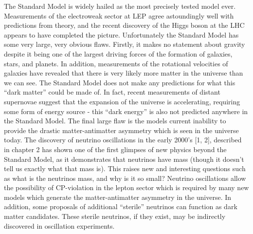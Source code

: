 The Standard Model is widely hailed as the most precisely tested model ever. Measurements
of the electroweak sector at LEP agree astoundingly well with predictions
from theory, and the recent discovery of the Higgs boson at the LHC appears to
have completed the picture.
Unfortunately the Standard Model has some very large, very obvious flaws.
Firstly, it makes no statement about gravity despite it being one of the largest
driving forces of the formation of galaxies, stars, and planets. In addition, measurements
of the rotational velocities of galaxies have revealed that there is very
likely more matter in the universe than we can see. The Standard Model does not
make any predictions for what this “dark matter” could be made of. In fact, recent
measurements of distant supernovae suggest that the expansion of the universe is
accelerating, requiring some form of energy source - this “dark energy” is also not
predicted anywhere in the Standard Model. The final large flaw is the models current
inability to provide the drastic matter-antimatter asymmetry which is seen in
the universe today.
The discovery of neutrino oscillations in the early 2000’s [1, 2], described in
chapter 2 has shown one of the first glimpses of new physics beyond the Standard
Model, as it demonstrates that neutrinos have mass (though it doesn’t tell us exactly
what that mass is). This raises new and interesting questions such as what is the
neutrinos mass, and why is it so small?
Neutrino oscillations allow the possibility of CP-violation in the lepton sector
which is required by many new models which generate the matter-antimatter asymmetry
in the universe. In addition, some proposals of additional “sterile” neutrinos
can function as dark matter candidates. These sterile neutrinos, if they exist, may
be indirectly discovered in oscillation experiments.
